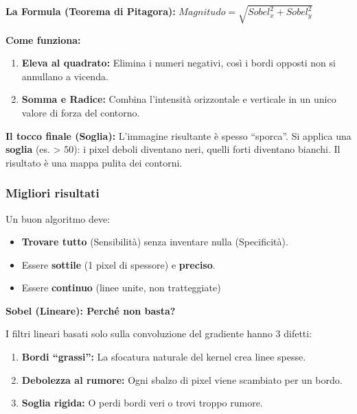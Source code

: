 \documentclass[
]{article}
\providecommand{\tightlist}{%
  \setlength{\itemsep}{0pt}\setlength{\parskip}{0pt}}
\begin{document}
\textbf{La Formula (Teorema di Pitagora):}
\(Magnitudo = \sqrt{Sobel_x^2 + Sobel_y^2}\)

\textbf{Come funziona:}

\begin{enumerate}
\def\labelenumi{\arabic{enumi}.}
\tightlist
\item
  \textbf{Eleva al quadrato:} Elimina i numeri negativi, così i bordi opposti non si annullano a vicenda.
\item
  \textbf{Somma e Radice:} Combina l'intensità orizzontale e verticale in un unico valore di forza del contorno.
\end{enumerate}

\textbf{Il tocco finale (Soglia):}
L'immagine risultante è spesso ``sporca''. Si applica una \textbf{soglia} (es. \textgreater{} 50): i pixel deboli diventano neri, quelli forti diventano bianchi. Il risultato è una mappa pulita dei contorni.

\hypertarget{migliori-risultati}{%
\subsubsection{Migliori risultati}\label{migliori-risultati}}

Un buon algoritmo deve:

\begin{itemize}
\tightlist
\item
  \textbf{Trovare tutto} (Sensibilità) senza inventare nulla (Specificità).
\item
  Essere \textbf{sottile} (1 pixel di spessore) e \textbf{preciso}.
\item
  Essere \textbf{continuo} (linee unite, non tratteggiate)
\end{itemize}

\textbf{Sobel (Lineare): Perché non basta?}

I filtri lineari basati solo sulla convoluzione del gradiente hanno 3 difetti:

\begin{enumerate}
\def\labelenumi{\arabic{enumi}.}
\tightlist
\item
  \textbf{Bordi ``grassi'':} La sfocatura naturale del kernel crea linee spesse.
\item
  \textbf{Debolezza al rumore:} Ogni sbalzo di pixel viene scambiato per un bordo.
\item
  \textbf{Soglia rigida:} O perdi bordi veri o trovi troppo rumore.
\end{enumerate}
\end{document}
